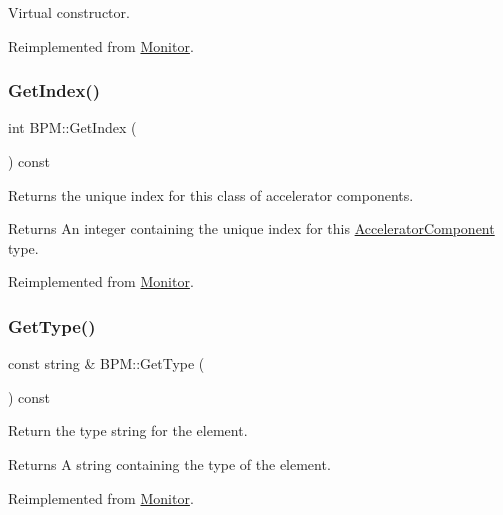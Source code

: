Virtual constructor. 

Reimplemented from \hyperlink{classMonitor_a66d7932308a7206eeefc552bd3f5b1f6}{Monitor}.

\mbox{\label{classBPM_acaf99f021f92252962f2fbcbc24a2679}} 
\subsubsection{\texorpdfstring{Get\+Index()}{GetIndex()}}
{\footnotesize\ttfamily int B\+P\+M\+::\+Get\+Index (\begin{DoxyParamCaption}{ }\end{DoxyParamCaption}) const\hspace{0.3cm}{\ttfamily [virtual]}}

Returns the unique index for this class of accelerator components. \begin{DoxyReturn}{Returns}
An integer containing the unique index for this \hyperlink{classAcceleratorComponent}{Accelerator\+Component} type. 
\end{DoxyReturn}


Reimplemented from \hyperlink{classMonitor_a38297eb50d06dd56201f2b48d92aa789}{Monitor}.

\mbox{\label{classBPM_a1fbab5ffd976674ed24ef5833caaf7ee}} 
\subsubsection{\texorpdfstring{Get\+Type()}{GetType()}}
{\footnotesize\ttfamily const string \& B\+P\+M\+::\+Get\+Type (\begin{DoxyParamCaption}{ }\end{DoxyParamCaption}) const\hspace{0.3cm}{\ttfamily [virtual]}}

Return the type string for the element. \begin{DoxyReturn}{Returns}
A string containing the type of the element. 
\end{DoxyReturn}


Reimplemented from \hyperlink{classMonitor_a8408f173bef0f0c0dd89b6624c84f66b}{Monitor}.

\mbox{\label{classBPM_a3f0db54eff4f4e95fc2dd81728ea8759}} 
